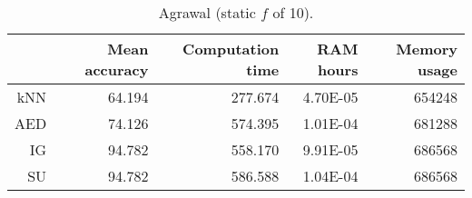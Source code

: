 \begin{table}[h]
\centering
\begin{tabular}{r|rrrr}
    & Mean accuracy & Computation time & RAM hours & Memory usage \\ \hline
kNN & 64.194                   & 277.674         & 4.70E-05  & 654248       \\
AED & 74.126                   & 574.395         & 1.01E-04  & 681288       \\
IG  & 94.782                   & 558.170         & 9.91E-05  & 686568       \\
SU  & 94.782                   & 586.588         & 1.04E-04  & 686568      
\end{tabular}
\caption{Agrawal (static $f$ of 10).}
\label{Table:Agrawal}
\end{table}